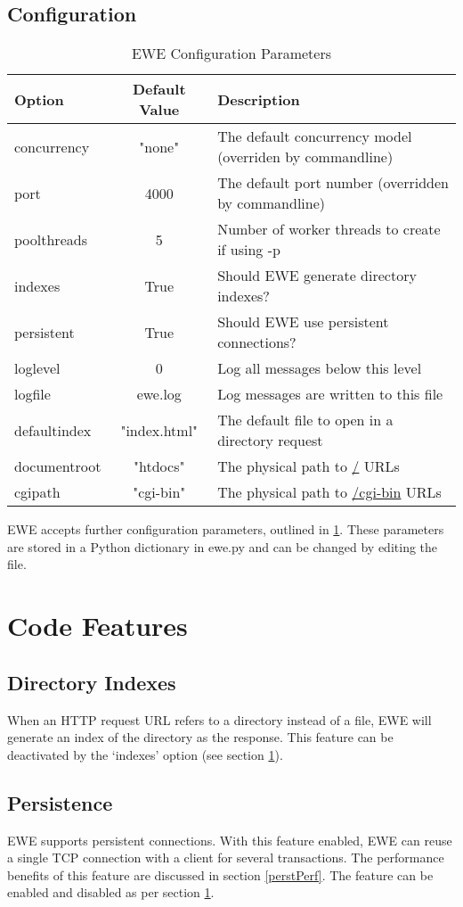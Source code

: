 \documentclass{article}
\begin{document}
\subsection{Configuration}\label{config}
\begin{table}[h]
\begin{tabular}{|l|c|l|}
\hline
Option & Default Value & Description \\
\hline
concurrency & "none" & The default concurrency model (overriden by commandline) \\
port & 4000 & The default port number (overridden by commandline) \\
poolthreads & 5 & Number of worker threads to create if using -p \\
indexes & True & Should EWE generate directory indexes? \\
persistent & True & Should EWE use persistent connections? \\
loglevel & 0 & Log all messages below this level \\
logfile & ewe.log & Log messages are written to this file \\
defaultindex & "index.html" & The default file to open in a directory request\\
documentroot & "htdocs" & The physical path to \url{/} URLs \\
cgipath & "cgi-bin" & The physical path to \url{/cgi-bin} URLs \\
\hline
\end{tabular}
\caption{EWE Configuration Parameters}\label{config}
\end{table}

EWE accepts further configuration parameters, outlined in \ref{config}.
These parameters are stored in a Python dictionary in ewe.py and can be changed by editing the file.

\section{Code Features}
\subsection{Directory Indexes}
When an HTTP request URL refers to a directory instead of a file, EWE will generate an index of the directory as the response.
This feature can be deactivated by the `indexes' option (see section \ref{config}).

\subsection{Persistence}
EWE supports persistent connections.
With this feature enabled, EWE can reuse a single TCP connection with a client for several transactions.
The performance benefits of this feature are discussed in section \ref{perstPerf}.
The feature can be enabled and disabled as per section \ref{config}.
\end{document}
